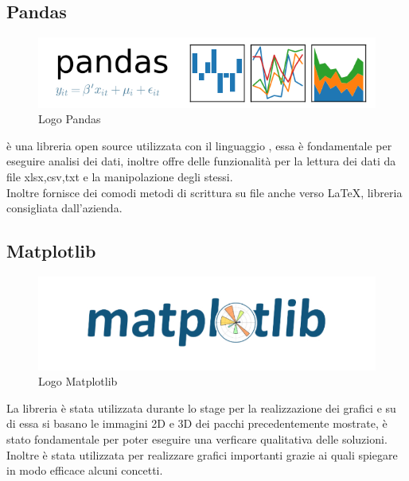 \subsection{Pandas}
\begin{figure}[H]
	\begin{center} \includegraphics[scale=0.6]{figures/pandas_logo}
		\caption[Logo Pandas]{Logo Pandas}
	\end{center}
\end{figure}
 è una libreria open source utilizzata con il linguaggio , essa è fondamentale per eseguire analisi dei dati, inoltre offre delle funzionalità per la lettura dei dati da file xlsx,csv,txt e la manipolazione degli stessi. \\
Inoltre fornisce dei comodi metodi di scrittura su file anche verso \LaTeX, libreria consigliata dall'azienda.

\subsection{Matplotlib}
\begin{figure}[H]
	\begin{center} \includegraphics[scale=0.4]{figures/matplotlib-1}
		\caption[Logo Matplotlib]{Logo Matplotlib}
	\end{center}
\end{figure}
La libreria  è stata utilizzata durante lo stage per la realizzazione dei grafici e su di essa si basano le immagini 2D e 3D dei pacchi precedentemente mostrate, è stato fondamentale per poter eseguire una verficare qualitativa delle soluzioni. Inoltre è stata utilizzata per realizzare grafici importanti grazie ai quali spiegare in modo efficace alcuni concetti.

